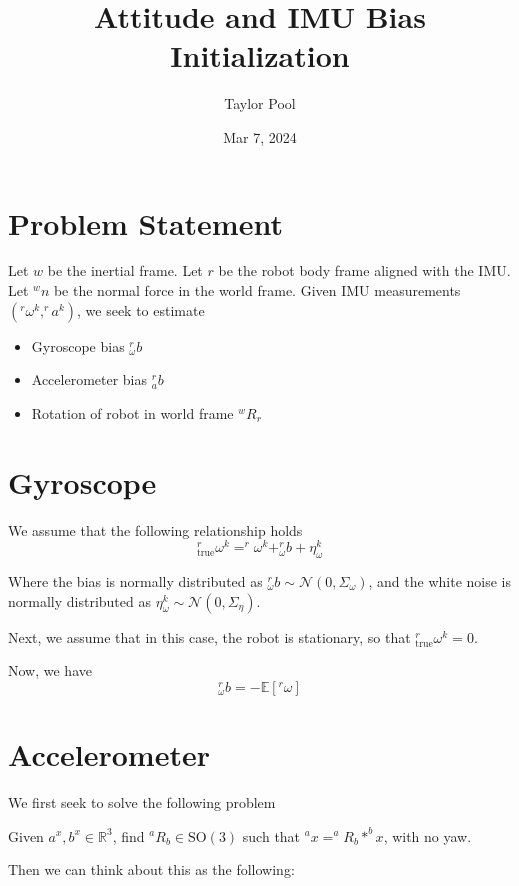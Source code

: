 \documentclass{article}
\title{Attitude and IMU Bias Initialization}
\author{Taylor Pool}
\date{Mar 7, 2024}
\begin{document}
\maketitle

\section{Problem Statement}

Let $w$ be the inertial frame. Let $r$ be the robot body frame aligned with the IMU. Let $^w n$ be the normal force in the world frame.
Given IMU measurements $(^r \omega^k, ^r a^k)$, we seek to estimate

\begin{itemize}
	\item Gyroscope bias $^r_\omega b$
	\item Accelerometer bias $^r_a b$
	\item Rotation of robot in world frame $^w R_r$
\end{itemize}

\section{Gyroscope}

We assume that the following relationship holds
\begin{equation}
	^r_\mathrm{true} \omega^k = ^r \omega^k + ^r_\omega b + \eta_\omega^k
\end{equation}

Where the bias is normally distributed as $^r_\omega b \sim \mathcal{N}(0, \Sigma_\omega)$,
and the white noise is normally distributed as $\eta_\omega^k \sim \mathcal{N}(0, \Sigma_\eta)$.

Next, we assume that in this case, the robot is stationary, so that $^r_\mathrm{true} \omega^k = 0$.

Now, we have
\begin{equation}
	^r_\omega b = -\mathbb{E}\left[^r \omega\right]
\end{equation}

\section{Accelerometer}

We first seek to solve the following problem

Given $a^ x, b^ x \in \mathbb{R}^3$, find $^a R_b \in \mathrm{SO}(3)$ such that $^a x = ^a R_b * ^b x$, with no yaw.

Then we can think about this as the following:
\end{document}
